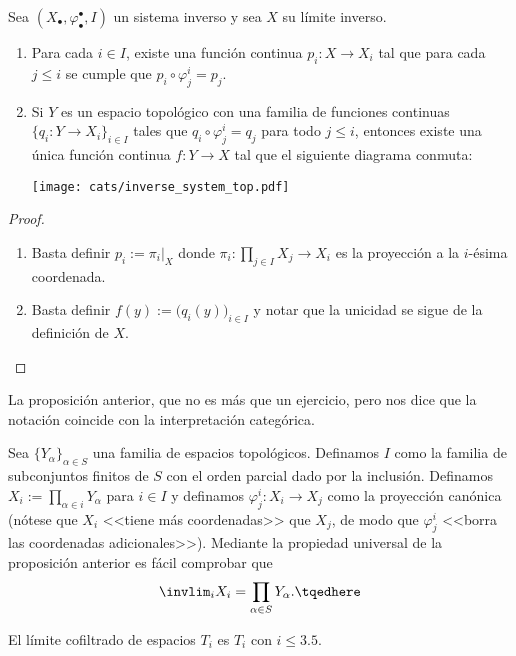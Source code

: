 \documentclass[topologia-analisis.tex]{subfiles}
\begin{document}
\begin{prop}
	Sea $(X_\bullet, \varphi^\bullet_\bullet, I)$ un sistema inverso y sea $X$ su límite inverso.
	\begin{enumerate}
		\item Para cada $i \in I$, existe una función continua $p_i \colon X \to X_i$
			tal que para cada $j \le i$ se cumple que $p_i \circ \varphi^i_j = p_j$.
		\item Si $Y$ es un espacio topológico con una familia de funciones continuas $\{ q_i \colon Y \to X_i \}_{i\in I}$
			tales que $q_i \circ \varphi^i_j = q_j$ para todo $j \le i$,
			entonces existe una única función continua $f \colon Y \to X$ tal que el siguiente diagrama conmuta:
			\begin{center}
				\texttt{[image: cats/inverse\_system\_top.pdf]}
			\end{center}
	\end{enumerate}
\end{prop}
\begin{proof}
	\begin{enumerate}
		\item Basta definir $p_i := \pi_i|_X$ donde $\pi_i \colon \prod_{j\in I} X_j \to X_i$ es la proyección a la $i$-ésima coordenada.
		\item Basta definir $f(y) := \big( q_i(y) \big)_{i\in I}$ y notar que la unicidad se sigue de la definición de $X$.
			\qedhere
	\end{enumerate}
\end{proof}
La proposición anterior, que no es más que un ejercicio, pero nos dice que la notación coincide con la interpretación categórica.

\begin{exn}
	Sea $\{ Y_\alpha \}_{\alpha\in S}$ una familia de espacios topológicos.
	Definamos $I$ como la familia de subconjuntos finitos de $S$ con el orden parcial dado por la inclusión.
	Definamos $X_i := \prod_{\alpha \in i} Y_\alpha$ para $i \in I$ y definamos $\varphi^i_j \colon X_i \to X_j$ como la proyección canónica
	(nótese que $X_i$ <<tiene más coordenadas>> que $X_j$, de modo que $\varphi^i_j$ <<borra las coordenadas adicionales>>).
	Mediante la propiedad universal de la proposición anterior es fácil comprobar que
	\begin{equation}
		\invlim_i X_i = \prod_{\alpha \in S} Y_\alpha.
		\tqedhere
	\end{equation}
\end{exn}

\begin{prop}
	El límite cofiltrado de espacios $T_i$ es $T_i$ con $i \le 3.5$.
\end{prop}
\end{document}
